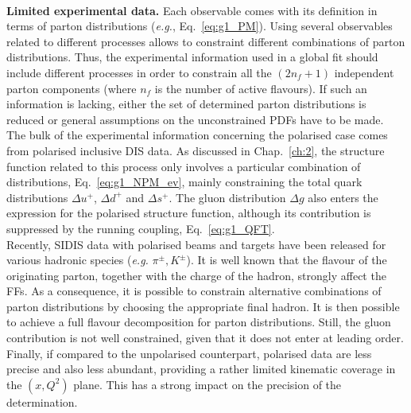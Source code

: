 \endgroup
\\[10pt]
\begingroup
\textbf{Limited experimental data.} Each observable comes with its definition in terms of parton distributions (\textit{e.g.}, Eq.~\eqref{eq:g1_PM}). Using several observables related to different processes allows to constraint different combinations of parton distributions. Thus, the experimental information used in a global fit should include different processes in order to constrain all the $(2 n_f + 1)$ independent parton components (where $n_f$ is the number of active flavours). If such an information is lacking, either the set of determined parton distributions is reduced or general assumptions on the unconstrained PDFs have to be made.
\\[6pt]
The bulk of the experimental information concerning the polarised case comes from polarised inclusive DIS data. As discussed in Chap.~\eqref{ch:2}, the structure function related to this process only involves a particular combination of distributions, Eq.~\ref{eq:g1_NPM_ev}, mainly constraining the total quark distributions $\Delta u^{+}$, $\Delta d^{+}$ and $\Delta s^{+}$. The gluon distribution $\Delta g$ also enters the expression for the polarised structure function, although its contribution is suppressed by the running coupling, Eq.~\eqref{eq:g1_QFT}.
\\[6pt]
Recently, SIDIS data with polarised beams and targets have been released for various hadronic species (\textit{e.g.} $\pi^{\pm},K^{\pm}$). It is well known that the flavour of the originating parton, together with the charge of the hadron, strongly affect the FFs. As a consequence, it is possible to constrain alternative combinations of parton distributions by choosing the appropriate final hadron. It is then possible to achieve a full flavour decomposition for parton distributions. Still, the gluon contribution is not well constrained, given that it does not enter at leading order.
\\[6pt]
Finally, if compared to the unpolarised counterpart, polarised data are less precise and also less abundant, providing a rather limited kinematic coverage in the $(x,Q^2)$ plane. This has a strong impact on the precision of the determination.
\endgroup
\\[10pt]
\begingroup
